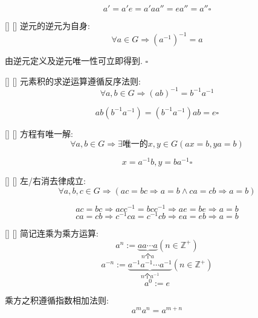 \documentclass[UTF8]{ctexart}
\begin{document}
        \begin{prf} 
			\[a'=a'e=a'aa''=ea''=a''\square\]
		\end{prf}
  
		\begin{ppt}
            []
            {}
            []
            []
			逆元的逆元为自身: 
			\[\forall a\in G\Longrightarrow(a^{-1})^{-1}=a\]
		\end{ppt}
        \begin{prf}	
			由逆元定义及逆元唯一性可立即得到. $\square$
		\end{prf}
  
		\begin{ppt}
            []
            {}
            []
            []
			元素积的求逆运算遵循反序法则: 
			\[\forall a,b\in G\Longrightarrow(ab)^{-1}=b^{-1}a^{-1}\]
		\end{ppt}

        \begin{prf}
			\[ab(b^{-1}a^{-1})=(b^{-1}a^{-1})ab=e\square\]
		\end{prf}
  
		\begin{ppt}
            []
            {}
            []
            []
			方程有唯一解: 
			\[\forall a,b\in G\Longrightarrow\exists\text{唯一的}x,y\in G(ax=b,ya=b)\]
		\end{ppt}
		\begin{prf}
			\[x=a^{-1}b,y=ba^{-1}\square\]
		\end{prf}
  
		\begin{ppt}
            []
            {}
            []
            []
			左/右消去律成立: 
			\[\forall a,b,c\in G\Longrightarrow(ac=bc\Longrightarrow a=b\wedge ca=cb\Longrightarrow a=b)\]
		\end{ppt}
        \begin{prf}
			\[ac=bc\Longrightarrow acc^{-1}=bcc^{-1}\Longrightarrow ae=be\Longrightarrow a=b\]
			\[ca=cb\Longrightarrow c^{-1}ca=c^{-1}cb\Longrightarrow ea=eb\Longrightarrow a=b\]
		\end{prf}
  
		\begin{ppt}
            []
            {}
            []
            []
			简记连乘为乘方运算: 
			\[a^{n}:=\underbrace{aa\cdots a}_{n\text{个}a}(n\in \mathbb{Z}^{+})\]
			\[a^{-n}:=\underbrace{a^{-1}a^{-1}\cdots a^{-1}}_{n\text{个}a^{-1}}(n\in \mathbb{Z}^{+})\]
			\[a^{0}:=e\]
			
			乘方之积遵循指数相加法则: 
			\[a^{m}a^{n}=a^{m+n}\]
		\end{ppt}
		
\end{document}
